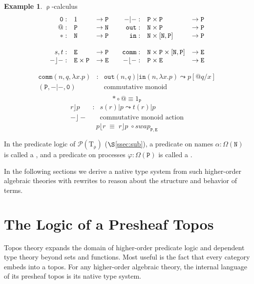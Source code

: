 \documentclass[conference]{IEEEtran}
\theoremstyle{definition}
\newtheorem{example}[theorem]{Example}
\newcommand{\define}[1]{{\bf \boldmath{#1}}}
\newcommand{\msc}[1]{\mathscr{#1}}
\newcommand{\mrm}[1]{\mathrm{#1}}
\newcommand{\mtt}[1]{\mathtt{#1}}
\newcommand{\T}{\mrm{T}}
\newcommand{\pow}{\msc{P}}
\newcommand{\N}{\mtt{N}}
\newcommand{\PP}{\mtt{P}}
\newcommand{\tto}{\mtt{out}}
\newcommand{\tti}{\mtt{in}}
\newcommand{\ttz}{\mtt{0}}
\begin{document}
\begin{example}
$\uprho$-calculus
\[\begin{array}{rll@{\quad\quad}rll}
    \ttz: &1 &\to \PP & -\vert-: & \PP\times\PP & \to \PP \\
    @: & \PP & \to \N &  \mtt{out}: & \N\times\PP & \to \PP\\
    \ast: & \N & \to \PP & \mtt{in}: & \N\times[\N,\PP] & \to \PP\\~\\
    s,t: &\mtt{E} & \to \PP & \mtt{comm}: &\N\times\PP\times [\N,\PP] & \to \mtt{E}\\
    -\rfloor-: & \mtt{E}\times\PP & \to \mtt{E} & -\lfloor-: & \PP \times \mtt{E} & \to \mtt{E}\\
\end{array}\]

\[\begin{array}{rcl}
    \mtt{comm}(n,q,\lambda x.p) & : & \tto(n,q)|\tti(n,\lambda x.p) \leadsto p[@q/x]\\
    (\PP,-|-,\ttz) && \text{commutative monoid}\\
    \end{array}\]
\[\ast\circ @ \equiv 1_\PP\]
\[\begin{array}{rcl}
    r \rfloor p & : & s(r) | p \leadsto t(r) | p \\
    -\rfloor - && \text{commutative monoid action}
\end{array}\]
\[p \lfloor r \;\equiv \; r\rfloor p \; \circ swap_{\PP,\mtt{E}}\]
\end{example}

In the predicate logic of $\pow(\T_\uprho)$ ($\S$\ref{ssec:sub}), a predicate on names $\alpha:\Omega(\N)$ is called a \define{namespace} \cite{namespace}, and a predicate on processes $\varphi:\Omega(\PP)$ is called a \define{codespace}.

In the following sections we derive a native type system from such higher-order algebraic theories with rewrites to reason about the structure and behavior of terms.




\section{The Logic of a Presheaf Topos}
\label{sec:topos}

Topos theory \cite{sheavesinGL} expands the domain of higher-order predicate logic and dependent type theory beyond sets and functions. Most useful is the fact that every category embeds into a topos. For any higher-order algebraic theory, the internal language of its presheaf topos is its native type system.
\end{document}
